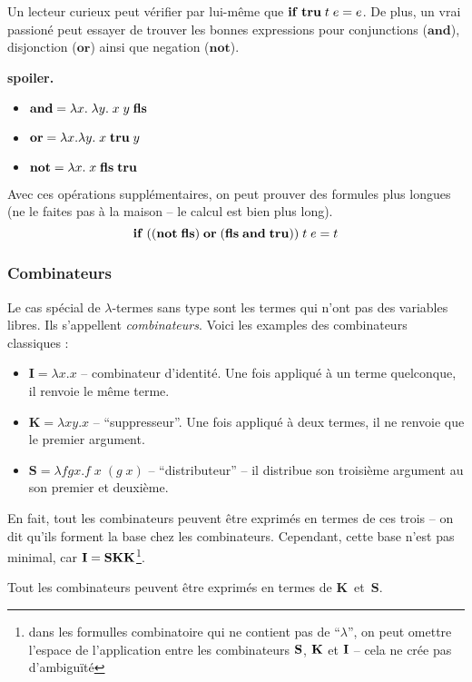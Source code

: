 Un lecteur curieux peut vérifier par lui-même que $\mathbf{if} \; \mathbf{tru} \; t \; e = e$.
De plus, un vrai passioné peut essayer de trouver les bonnes expressions pour conjunctions ($\mathbf{and}$), disjonction ($\mathbf{or}$) ainsi que negation ($\mathbf{not}$).

\textbf{spoiler.} 
\begin{itemize}
	\item $\mathbf{and} = \lambda x. \; \lambda y. \; x \; y \; \mathbf{fls}$
	\item $\mathbf{or} = \lambda x. \lambda y. \; x \; \mathbf{tru} \; y$
	\item $\mathbf{not} = \lambda x. \; x \; \mathbf{fls} \; \mathbf{tru}$
\end{itemize}

Avec ces opérations supplémentaires, on peut prouver des formules plus longues (ne le faites pas à la maison -- le calcul est bien plus long).
$$\mathbf{if} \; ((\mathbf{not} \; \mathbf{fls}) \; \mathbf{or} \; (\mathbf{fls} \; \mathbf{and} \; \mathbf{tru})) \; t \; e = t$$

\subsubsection*{Combinateurs}
Le cas spécial de $\lambda$-termes sans type sont les termes qui n'ont pas des variables libres. Ils s'appellent \emph{combinateurs}.
Voici les examples des combinateurs classiques :
\begin{itemize}
	\item $\mathbf{I} = \lambda x. x$ -- combinateur d'identité. Une fois appliqué à un terme quelconque, il renvoie le même terme.
	\item $\mathbf{K} = \lambda x y. x$ -- ``suppresseur''. Une fois appliqué à deux termes, il ne renvoie que le premier argument.
	\item $\mathbf{S} = \lambda fgx. f \; x \; (g \; x)$ -- ``distributeur'' -- il distribue son troisième argument au son premier et deuxième.
\end{itemize}
En fait, tout les combinateurs peuvent être exprimés en termes de ces trois -- on dit qu'ils forment la base chez les combinateurs.
Cependant, cette base n'est pas minimal, car $\mathbf{I} = \mathbf{S} \mathbf{K} \mathbf{K}$\footnote{dans les formulles combinatoire qui ne contient pas de ``$\lambda$'', on peut omettre l'espace de l'application entre les combinateurs $\mathbf{S}$, $\mathbf{K}$ et $\mathbf{I}$ -- cela ne crée pas d'ambiguïté}.

\begin{theorem}
Tout les combinateurs peuvent être exprimés en termes de $\mathbf{K}$~et~$\mathbf{S}$.
\end{theorem}


